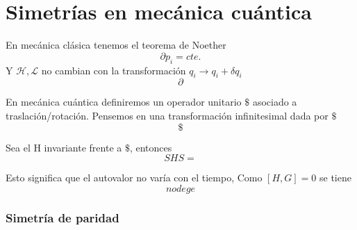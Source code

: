 \documentclass[10pt,oneside]{CBFT_book}
\begin{document}
\chapter{Simetrías en mecánica cuántica}

En mecánica clásica tenemos el teorema de Noether 
\[
	\partial p_i = cte.
\]
Y $\mathcal{H}, \mathcal{L}$ no cambian con la transformación $q_i \longrightarrow q_i + \delta q_i$
\[
	\partial 
\]

En mecánica cuántica definiremos un operador unitario $\$$ asociado a traslación/rotación. Pensemos en una 
transformación infinitesimal dada por $\$$
\[
	\$
\]

Sea el H invariante frente a $\$$, entonces 
\[
	SHS =
\]

Esto significa que el autovalor no varía con el tiempo, Como $[H,G]=0$ se tiene 
\[
	no dege 
\]

\subsection{Simetría de paridad}
\end{document}
